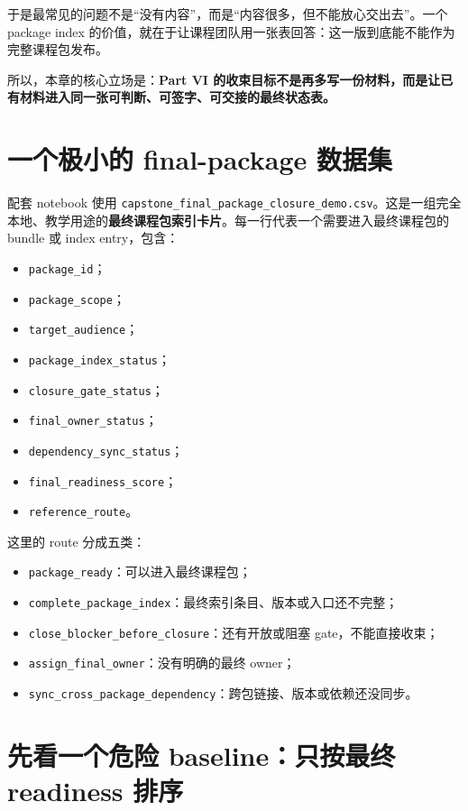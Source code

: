 于是最常见的问题不是“没有内容”，而是“内容很多，但不能放心交出去”。一个 package index 的价值，就在于让课程团队用一张表回答：这一版到底能不能作为完整课程包发布。

所以，本章的核心立场是：\textbf{Part VI 的收束目标不是再多写一份材料，而是让已有材料进入同一张可判断、可签字、可交接的最终状态表。}

\section{一个极小的 final-package 数据集}

配套 notebook 使用 \nolinkurl{capstone_final_package_closure_demo.csv}。这是一组完全本地、教学用途的\textbf{最终课程包索引卡片}。每一行代表一个需要进入最终课程包的 bundle 或 index entry，包含：

\begin{itemize}
    \item \texttt{package\_id}；
    \item \texttt{package\_scope}；
    \item \texttt{target\_audience}；
    \item \texttt{package\_index\_status}；
    \item \texttt{closure\_gate\_status}；
    \item \texttt{final\_owner\_status}；
    \item \texttt{dependency\_sync\_status}；
    \item \texttt{final\_readiness\_score}；
    \item \texttt{reference\_route}。
\end{itemize}

这里的 route 分成五类：

\begin{itemize}
    \item \texttt{package\_ready}：可以进入最终课程包；
    \item \texttt{complete\_package\_index}：最终索引条目、版本或入口还不完整；
    \item \texttt{close\_blocker\_before\_closure}：还有开放或阻塞 gate，不能直接收束；
    \item \texttt{assign\_final\_owner}：没有明确的最终 owner；
    \item \texttt{sync\_cross\_package\_dependency}：跨包链接、版本或依赖还没同步。
\end{itemize}

\section{先看一个危险 baseline：只按最终 readiness 排序}

